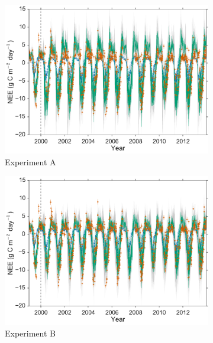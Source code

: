 \documentclass[review]{elsarticle}
\begin{document}
\begin{figure}
    \centering
    \begin{subfigure}[b]{0.49\textwidth}
        \includegraphics[width=\textwidth]{A4dvar2.pdf}
        \caption{Experiment A}
        \label{fig:4dvardiagBR}
    \end{subfigure}
    \begin{subfigure}[b]{0.49\textwidth}
        \includegraphics[width=\textwidth]{B4dvar2.pdf}
        \caption{Experiment B}
        \label{fig:4dvaredcBR}
    \end{subfigure}
    \begin{subfigure}[b]{0.49\textwidth}

\end{subfigure}
\end{figure}
\end{document}
